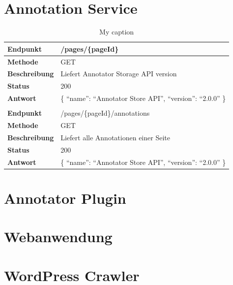     \section{Annotation Service}
        \begin{table}[htb]
            \centering
            \begin{tabular}{|l|l|}
            \hline
            \textbf{Endpunkt}     & /pages/\{pageId\}\\
            \hline
            \textbf{Methode}      & GET\\
            \hline
            \textbf{Beschreibung} & Liefert Annotator Storage API version\\
            \hline
            \textbf{Status}       & 200\\
            \hline
            \textbf{Antwort}      & \{ ``name'': ``Annotator Store API'', ``version'': ``2.0.0'' \}\\
            \hline
            & \\
            \hline
            \textbf{Endpunkt}     & /pages/\{pageId\}/annotations\\
            \hline
            \textbf{Methode}      & GET\\
            \hline
            \textbf{Beschreibung} & Liefert alle Annotationen einer Seite\\
            \hline
            \textbf{Status}       & 200\\
            \hline
            \textbf{Antwort}      & \{ ``name'': ``Annotator Store API'', ``version'': ``2.0.0'' \}\\
            \hline
            \end{tabular}
            \caption{My caption}
            \label{my-label}
        \end{table}

    \section{Annotator Plugin}
    \section{Webanwendung}
    \section{WordPress Crawler}

    